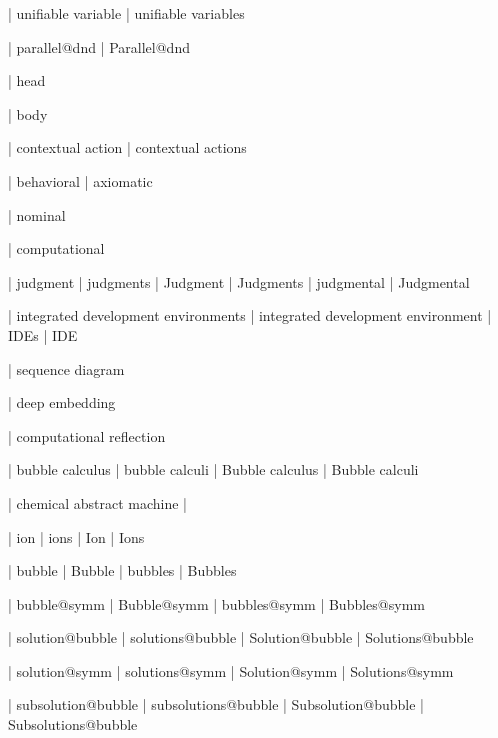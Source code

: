  | unifiable variable
 | unifiable variables

 | parallel@dnd
 | Parallel@dnd




 | head

 | body

 | contextual action
 | contextual actions
 
 | behavioral
 | axiomatic

 | nominal

 | computational

 | judgment
 | judgments
 | Judgment
 | Judgments
 | judgmental
 | Judgmental


 | integrated development environments
 | integrated development environment
 | IDEs
 | IDE

 | sequence diagram

 | deep embedding

 | computational reflection


 | bubble calculus
 | bubble calculi
 | Bubble calculus
 | Bubble calculi

 | chemical abstract machine
 | \cham
 
 | ion
 | ions
 | Ion
 | Ions

 | bubble
 | Bubble
 | bubbles
 | Bubbles

 | bubble@symm
 | Bubble@symm
 | bubbles@symm
 | Bubbles@symm

 | solution@bubble
 | solutions@bubble
 | Solution@bubble
 | Solutions@bubble

 | solution@symm
 | solutions@symm
 | Solution@symm
 | Solutions@symm

 | subsolution@bubble
 | subsolutions@bubble
 | Subsolution@bubble
 | Subsolutions@bubble

